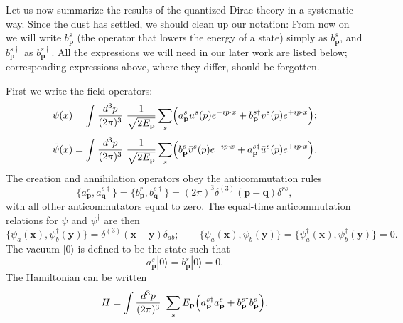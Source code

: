 Let us now summarize the results of the quantized Dirac theory in a
systematic way.  Since the dust has settled, we should clean up our notation:
From now on we will write $b_{\mathbf{p}}^s$ (the operator that lowers the
energy of a state) simply as $b_{\mathbf{p}}^s$, and $b_{\mathbf{p}}^{s\dagger}$
as $b_{\mathbf{p}}^{s\dagger}$.  All the expressions we will need in our later
work are listed below; corresponding expressions above, where they differ,
should be forgotten.

First we write the field operators:
\begin{equation}
  \psi(x) = \int \frac{d^3p}{(2\pi)^3}\ \frac{1}{\sqrt{2E_{\mathbf{p}}}}
    \sum_s \Bigl( a_{\mathbf{p}}^s u^s(p)e^{-ip\cdot x}
      + b_{\mathbf{p}}^{s\dagger} v^s(p)e^{+ip\cdot x} \Bigr);
  \label{eq:3.101}
\end{equation}
\begin{equation}
  \bar{\psi}(x) = \int \frac{d^3p}{(2\pi)^3}\ \frac{1}{\sqrt{2E_{\mathbf{p}}}}
    \sum_s \Bigl( b_{\mathbf{p}}^s \bar{v}^s(p)e^{-ip\cdot x}
      + a_{\mathbf{p}}^{s\dagger} \bar{u}^s(p)e^{+ip\cdot x} \Bigr).
  \label{eq:3.102}
\end{equation}
The creation and annihilation operators obey the anticommutation rules
\begin{equation}
  \{a_{\mathbf{p}}^r, a_{\mathbf{q}}^{s\dagger}\}
  = \{b_{\mathbf{p}}^r, b_{\mathbf{q}}^{s\dagger}\}
    = (2\pi)^3\delta^{(3)}(\mathbf{p}-\mathbf{q})\delta^{rs},
  \label{eq:3.103}
\end{equation}
with all other anticommutators equal to zero.  The equal-time anticommutation
relations for $\psi$ and $\psi^\dagger$ are then
\begin{equation}
  \{\psi_a(\mathbf{x}), \psi_b^\dagger(\mathbf{y})\}
    = \delta^{(3)}(\mathbf{x}-\mathbf{y})\delta_{ab};
  \qquad
  \{\psi_a(\mathbf{x}), \psi_b(\mathbf{y})\}
  = \{\psi_a^\dagger(\mathbf{x}), \psi_b^\dagger(\mathbf{y})\} = 0 .
  \label{eq:3.104}
\end{equation}
The vacuum $|0\rangle$ is defined to be the state such that
\begin{equation}
  a_{\mathbf{p}}^s|0\rangle = b_{\mathbf{p}}^s|0\rangle = 0 .
  \label{eq:3.105}
\end{equation}
The Hamiltonian can be written
\begin{equation}
  H = \int \frac{d^3p}{(2\pi)^3}\ \sum_s E_{\mathbf{p}}
    \Bigl( a_{\mathbf{p}}^{s\dagger}a_{\mathbf{p}}^s
      + b_{\mathbf{p}}^{s\dagger}b_{\mathbf{p}}^s \Bigr),
  \label{eq:3.106}
\end{equation}
